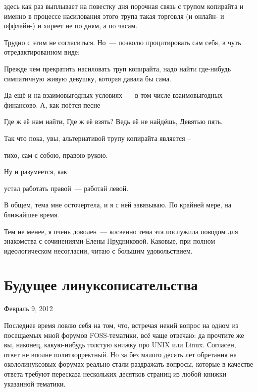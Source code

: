 \begin{shadequote}{}
здесь как раз выплывает на повестку дня порочная связь с трупом копирайта и именно в процессе насилования этого трупа такая торговля (и онлайн- и оффлайн-) и хиреет не по дням, а по часам.
\end{shadequote}

Трудно с этим не согласиться. Но~--- позволю процитировать сам себя, в чуть отредактированном виде:


\begin{shadequote}{}
Прежде чем прекратить насиловать труп копирайта, надо найти где-нибудь симпатичную живую девушку, которая давала бы сама. 
\end{shadequote}

Да ещё и на взаимовыгодных условиях~--- в том числе взаимовыгодных финансово. А, как поётся песне


\begin{shadequote}{}
Где ж её нам найти, Где ж её взять? Ведь её не найдёшь, Девятью пять.
\end{shadequote}

Так что пока, увы, альтернативой трупу копирайта является --


\begin{shadequote}{}
тихо, сам с собою, правою рукою.
\end{shadequote}

Ну и разумеется, как


\begin{shadequote}{}
устал работать правой~--- работай левой.
\end{shadequote}

В общем, тема мне осточертела, и я с ней завязываю. По крайней мере, на ближайшее время.

Тем не менее, я очень доволен~--- косвенно тема эта послужила поводом для знакомства с сочинениями Елены Прудниковой. Каковые, при полном идеологическом несогласии, читаю с большим удовольствием.

\section{Будущее линуксописательства} 
\begin{timeline}Февраль 9, 2012\end{timeline}
Последнее время ловлю себя на том, что, встречая некий вопрос на одном из посещаемых мной форумов FOSS-тематики, всё чаще отвечаю: да прочтите же вы, наконец, какую-нибудь толстую книжку про UNIX или Linux. Согласен, ответ не вполне политкорректный. Но за без малого десять лет обретания на окололинуксовых форумах реально стали раздражать вопросы, которые в качестве ответа требуют пересказа нескольких десятков страниц из любой книжки указанной тематики.

